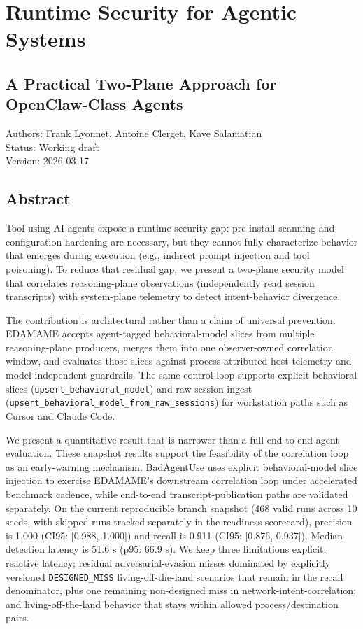 \documentclass[
]{article}
\author{}
\date{}
\begin{document}
\section{Runtime Security for Agentic
Systems}\label{runtime-security-for-agentic-systems}

\subsection{A Practical Two-Plane Approach for OpenClaw-Class
Agents}\label{a-practical-two-plane-approach-for-openclaw-class-agents}

Authors: Frank Lyonnet, Antoine Clerget, Kave Salamatian\\
Status: Working draft\\
Version: 2026-03-17

\subsection{Abstract}\label{abstract}

Tool-using AI agents expose a runtime security gap: pre-install scanning
and configuration hardening are necessary, but they cannot fully
characterize behavior that emerges during execution (e.g., indirect
prompt injection and tool poisoning). To reduce that residual gap, we
present a two-plane security model that correlates reasoning-plane
observations (independently read session transcripts) with system-plane
telemetry to detect intent-behavior divergence.

The contribution is architectural rather than a claim of universal
prevention. EDAMAME accepts agent-tagged behavioral-model slices from
multiple reasoning-plane producers, merges them into one observer-owned
correlation window, and evaluates those slices against
process-attributed host telemetry and model-independent guardrails. The
same control loop supports explicit behavioral slices
(\texttt{upsert\_behavioral\_model}) and raw-session ingest
(\texttt{upsert\_behavioral\_model\_from\_raw\_sessions}) for
workstation paths such as Cursor and Claude Code.

We present a quantitative result that is narrower than a full end-to-end
agent evaluation. These snapshot results support the feasibility of the
correlation loop as an early-warning mechanism. BadAgentUse uses
explicit behavioral-model slice injection to exercise EDAMAME's
downstream correlation loop under accelerated benchmark cadence, while
end-to-end transcript-publication paths are validated separately. On the
current reproducible branch snapshot (468 valid runs across 10 seeds,
with skipped runs tracked separately in the readiness scorecard),
precision is 1.000 (CI95: {[}0.988, 1.000{]}) and recall is 0.911 (CI95:
{[}0.876, 0.937{]}). Median detection latency is 51.6 s (p95: 66.9 s).
We keep three limitations explicit: reactive latency; residual
adversarial-evasion misses dominated by explicitly versioned
\texttt{DESIGNED\_MISS} living-off-the-land scenarios that remain in the
recall denominator, plus one remaining non-designed miss in
network-intent-correlation; and living-off-the-land behavior that stays
within allowed process/destination pairs.
\end{document}
